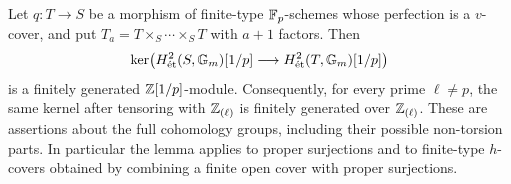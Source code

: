 \begin{lemma}
\label{lem:B-Gm-proper-kernel}
Let \(q:T\to S\) be a morphism of finite-type
\(\mathbb F_p\)-schemes whose perfection is a \(v\)-cover,
and put \(T_a=T\times_S\cdots\times_ST\)
with \(a+1\) factors.  Then
\[
 \ker\bigl(H^2_{\mathrm{\acute et}}(S,{\mathbb G_m})[1/p]
       \longrightarrow H^2_{\mathrm{\acute et}}(T,{\mathbb G_m})[1/p]\bigr)
\]
is a finitely generated \(\mathbb Z[1/p]\)-module.  Consequently,
for every prime \(\ell\ne p\), the same kernel after tensoring
with \(\mathbb Z_{(\ell)}\) is finitely generated over
\(\mathbb Z_{(\ell)}\).  These are assertions about the full
cohomology groups, including their possible non-torsion parts.
In particular the lemma applies to proper surjections and to
finite-type \(h\)-covers obtained by combining a finite open
cover with proper surjections.
\end{lemma}
